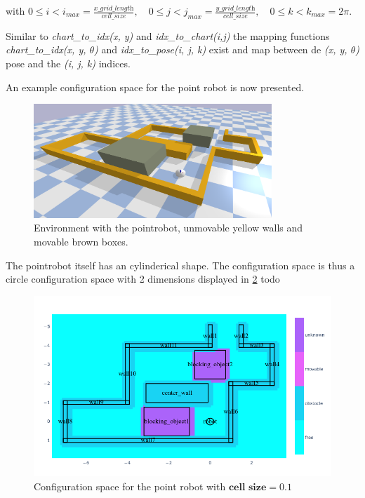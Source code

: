 with $0 \leq i < i_{max} = \frac{\textit{x\_grid\_length}}{\textit{cell\_size}}, \quad 0 \leq j < j_{max} = \frac{\textit{y\_grid\_length}}{\textit{cell\_size}}, \quad 0 \leq k < k_{max} = 2\pi$.\bs

Similar to \textit{chart\_to\_idx(x, y)} and \textit{idx\_to\_chart(i,j)} the mapping functions \textit{chart\_to\_idx(x, y, $\theta$)} and \textit{idx\_to\_pose(i, j, k)} exist and map between de \textit{(x, y, $\theta$)} pose and the \textit{(i, j, k)} indices.\bs

An example configuration space for the point robot is now presented.
\begin{figure}[H]
    \centering
    \includegraphics[width=0.8\textwidth]{figures/planning/two_push_to_freedom_env}
    \caption{Environment with the pointrobot, unmovable yellow walls and movable brown boxes.}%
    \label{fig:two_pushes_to_freedom_env}
\end{figure}

The pointrobot itself has an cylinderical shape. The configuration space is thus a circle configuration space with 2 dimensions displayed in \cref{fig:c_space_point_robot_medium} todo

\begin{figure}[H]
  \centering
  \includegraphics[width=1.0\textwidth, height=0.8\textwidth]{figures/planning/c_space_point_robot_grid_size_0_1}
  \caption{Configuration space for the point robot with $\textbf{cell size} = 0.1$}%
  \label{fig:c_space_point_robot_medium}
\end{figure}

